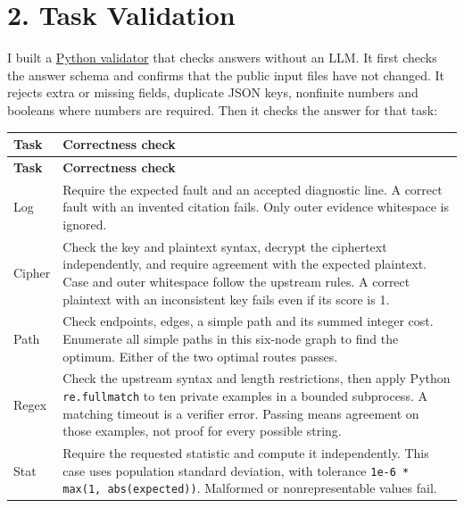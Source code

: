 \documentclass[10pt,letterpaper]{article}
\begin{document}
\section*{2. Task Validation}

I built a \href{https://github.com/a-little-hoof/580-final/blob/main/study/controlled/validators/validate.py}{Python validator} that checks answers without an LLM. It first checks the answer schema and confirms that the public input files have not changed. It rejects extra or missing fields, duplicate JSON keys, nonfinite numbers and booleans where numbers are required. Then it checks the answer for that task:

\begingroup
\small
\setlength{\tabcolsep}{4pt}
\renewcommand{\arraystretch}{1.15}
\begin{longtable}{@{}>{\raggedright\arraybackslash}p{.10\linewidth}>{\raggedright\arraybackslash}p{}@{}}
\toprule
\textbf{Task} & \textbf{Correctness check} \\
\midrule
\endfirsthead
\toprule
\textbf{Task} & \textbf{Correctness check} \\
\midrule
\endhead
\bottomrule
\endfoot
Log & Require the expected fault and an accepted diagnostic line. A correct fault with an invented citation fails. Only outer evidence whitespace is ignored. \\
Cipher & Check the key and plaintext syntax, decrypt the ciphertext independently, and require agreement with the expected plaintext. Case and outer whitespace follow the upstream rules. A correct plaintext with an inconsistent key fails even if its score is 1. \\
Path & Check endpoints, edges, a simple path and its summed integer cost. Enumerate all simple paths in this six-node graph to find the optimum. Either of the two optimal routes passes. \\
Regex & Check the upstream syntax and length restrictions, then apply Python \texttt{re.fullmatch} to ten private examples in a bounded subprocess. A matching timeout is a verifier error. Passing means agreement on those examples, not proof for every possible string. \\
Stat & Require the requested statistic and compute it independently. This case uses population standard deviation, with tolerance \texttt{1e-6 * max(1, abs(expected))}. Malformed or nonrepresentable values fail. \\
\end{longtable}
\endgroup
\end{document}
